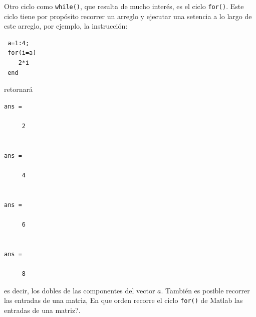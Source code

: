 \documentclass[11pt]{article}
\begin{document}
Otro ciclo como \texttt{while()}, que resulta de mucho inter\'es, es el ciclo \texttt{for()}. Este ciclo tiene por prop\'osito recorrer un arreglo y ejecutar una setencia a lo largo de este arreglo, por ejemplo, la instrucci\'on:
\begin{verbatim}
 a=1:4;
 for(i=a)
    2*i
 end
\end{verbatim}
retornar\'a
\begin{verbatim}
ans =

     2


ans =

     4


ans =

     6


ans =

     8

\end{verbatim}
es decir, los dobles de las componentes del vector $a$. Tambi\'en es posible recorrer las entradas de una matriz, \textquestiondown En que orden recorre el ciclo \texttt{for()} de Matlab las entradas de una matriz?.


\newpage
\end{document}
